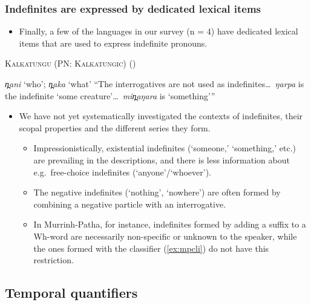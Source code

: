 \documentclass{article}
\begin{document}
\subsubsection{Indefinites are expressed by dedicated lexical items
  \label{sec:dili}}
\begin{itemize}
\item Finally, a few of the languages in our survey (n = 4) have dedicated lexical items that are used to express indefinite pronouns.
\end{itemize}
\begin{exe}
  \ex \textsc{Kalkatungu (PN: Kalkatungic)} (\citealt[104--5]{blake79})
  \begin{xlist}
    \ex \textit{\charis n̪ani} `who'; \textit{\charis n̪aka} `what'
    \ex ``The interrogatives are not used as indefinites\ldots\ \textit{\charis ŋarpa} is the indefinite `some creature'\ldots\ \textit{\charis min̪aŋara} is `something'\thinspace''
  \end{xlist}
\end{exe}

\begin{itemize}
\item We have not yet systematically investigated the contexts of indefinites, their scopal properties and the different series they form.
  \begin{itemize}
  \item Impressionistically, existential indefinites (`someone,' `something,' etc.) are prevailing in the descriptions, and there is less information about e.g.\ free-choice indefinites (`anyone'/`whoever').
  \item The negative indefinites (`nothing', `nowhere') are often formed by combining a negative particle with an interrogative.%
  \item In Murrinh-Patha, for instance, indefinites formed by adding a suffix to a Wh-word are necessarily non-specific or unknown to the speaker, while the ones formed with the classifier (\ref{ex:mpcli}) do not have this restriction.
  \end{itemize}
\end{itemize}


\subsection{Temporal quantifiers}
\label{sec:temporals}
\end{document}
